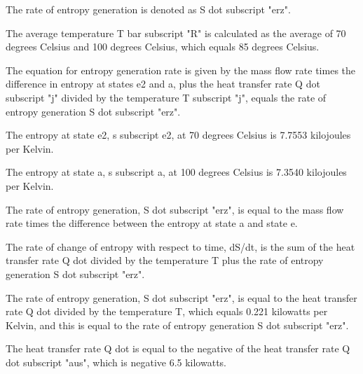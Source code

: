 The rate of entropy generation is denoted as S dot subscript "erz".

The average temperature T bar subscript "R" is calculated as the average of 70 degrees Celsius and 100 degrees Celsius, which equals 85 degrees Celsius.

The equation for entropy generation rate is given by the mass flow rate times the difference in entropy at states e2 and a, plus the heat transfer rate Q dot subscript "j" divided by the temperature T subscript "j", equals the rate of entropy generation S dot subscript "erz".

The entropy at state e2, s subscript e2, at 70 degrees Celsius is 7.7553 kilojoules per Kelvin.

The entropy at state a, s subscript a, at 100 degrees Celsius is 7.3540 kilojoules per Kelvin.

The rate of entropy generation, S dot subscript "erz", is equal to the mass flow rate times the difference between the entropy at state a and state e.

The rate of change of entropy with respect to time, dS/dt, is the sum of the heat transfer rate Q dot divided by the temperature T plus the rate of entropy generation S dot subscript "erz".

The rate of entropy generation, S dot subscript "erz", is equal to the heat transfer rate Q dot divided by the temperature T, which equals 0.221 kilowatts per Kelvin, and this is equal to the rate of entropy generation S dot subscript "erz".

The heat transfer rate Q dot is equal to the negative of the heat transfer rate Q dot subscript "aus", which is negative 6.5 kilowatts.